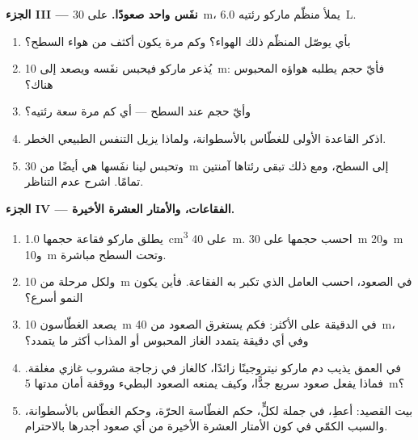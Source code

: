 \begin{problem}
\medskip
\noindent\textbf{الجزء III --- نفَس واحد صعودًا.}
على \qty{30}{m}، يملأ منظّم ماركو رئتيه \qty{6.0}{L}.
\begin{enumerate}[resume]
  \item بأي  يوصّل المنظّم ذلك الهواء؟ وكم مرة يكون
        أكثف من هواء السطح؟
  \item يُذعر ماركو فيحبس نفَسه ويصعد إلى \qty{10}{m}:
        فأيّ حجم يطلبه هواؤه المحبوس هناك؟
  \item وأيّ حجم عند السطح --- أي كم مرة سعة رئتيه؟
  \item اذكر القاعدة الأولى للغطّاس بالأسطوانة، ولماذا يزيل التنفس
        الطبيعي الخطر.
  \item وتحبس لينا نفَسها هي أيضًا من \qty{30}{m} إلى السطح،
        ومع ذلك تبقى رئتاها آمنتين تمامًا. اشرح عدم التناظر.
\end{enumerate}

\medskip
\noindent\textbf{الجزء IV --- الفقاعات، والأمتار العشرة الأخيرة.}
\begin{enumerate}[resume]
  \item يطلق ماركو فقاعة حجمها \qty{1.0}{cm^3} على \qty{40}{m}.
        احسب حجمها على \qty{30}{m} و\qty{20}{m} و\qty{10}{m}
        وتحت السطح مباشرة.
  \item ولكل مرحلة من \qty{10}{m} في الصعود، احسب العامل الذي
        تكبر به الفقاعة. فأين يكون النمو أسرع؟
  \item يصعد الغطّاسون \qty{10}{m} في الدقيقة على الأكثر: فكم يستغرق الصعود من
        \qty{40}{m}، وفي أي دقيقة يتمدد الغاز المحبوس أو المذاب
        أكثر ما يتمدد؟
  \item في العمق يذيب دم ماركو نيتروجينًا زائدًا، كالغاز في
        زجاجة مشروب غازي مغلقة. فماذا يفعل صعود سريع جدًّا، وكيف
        يمنعه الصعود البطيء ووقفة أمان مدتها \qty{5}{m}؟
  \item بيت القصيد: أعطِ، في جملة لكلٍّ، حكم الغطّاسة الحرّة،
        وحكم الغطّاس بالأسطوانة، والسبب الكمّي في كون
        الأمتار العشرة الأخيرة من أي صعود أجدرها بالاحترام.
\end{enumerate}
\end{problem}
